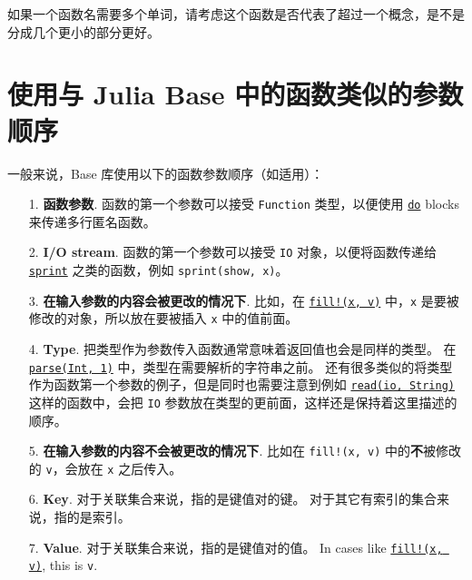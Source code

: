 如果一个函数名需要多个单词，请考虑这个函数是否代表了超过一个概念，是不是分成几个更小的部分更好。



\hypertarget{527161729759687978}{}


\section{使用与 Julia Base 中的函数类似的参数顺序}



一般来说，Base 库使用以下的函数参数顺序（如适用）：



\begin{itemize}
\item[1.  ] \textbf{函数参数}. 函数的第一个参数可以接受 \texttt{Function} 类型，以便使用 \hyperlink{16455129305818705265}{\texttt{do}} blocks 来传递多行匿名函数。


\item[2.  ] \textbf{I/O stream}. 函数的第一个参数可以接受 \texttt{IO} 对象，以便将函数传递给 \hyperlink{6652981552509545835}{\texttt{sprint}} 之类的函数，例如 \texttt{sprint(show, x)}。


\item[3.  ] \textbf{在输入参数的内容会被更改的情况下}. 比如，在 \hyperlink{5162290739791026948}{\texttt{fill!(x, v)}} 中，\texttt{x} 是要被修改的对象，所以放在要被插入 \texttt{x} 中的值前面。


\item[4.  ] \textbf{Type}. 把类型作为参数传入函数通常意味着返回值也会是同样的类型。 在 \hyperlink{14207407853646164654}{\texttt{parse(Int, {\textquotedbl}1{\textquotedbl})}} 中，类型在需要解析的字符串之前。 还有很多类似的将类型作为函数第一个参数的例子，但是同时也需要注意到例如 \hyperlink{8104134490906192097}{\texttt{read(io, String)}} 这样的函数中，会把 \texttt{IO} 参数放在类型的更前面，这样还是保持着这里描述的顺序。


\item[5.  ] \textbf{在输入参数的内容不会被更改的情况下}. 比如在 \texttt{fill!(x, v)} 中的\textbf{不}被修改的 \texttt{v}，会放在 \texttt{x} 之后传入。


\item[6.  ] \textbf{Key}. 对于关联集合来说，指的是键值对的键。 对于其它有索引的集合来说，指的是索引。


\item[7.  ] \textbf{Value}. 对于关联集合来说，指的是键值对的值。 In cases like \hyperlink{5162290739791026948}{\texttt{fill!(x, v)}}, this is \texttt{v}.



\end{itemize}
